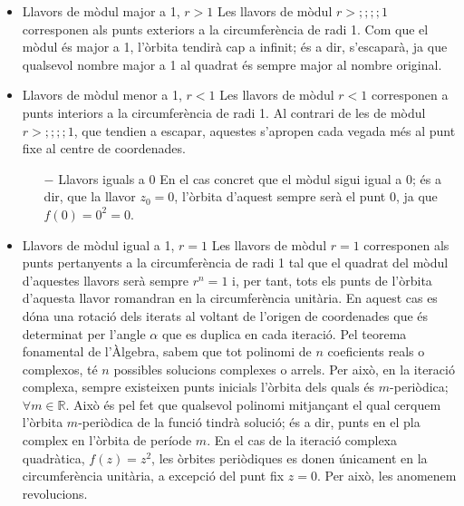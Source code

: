 \documentclass[12pt]{report}
\begin{document}
\begin{itemize}
    \item Llavors de mòdul major a 1, $r>1$
    \newline
   Les llavors de mòdul $r>;;;;1$ corresponen als punts exteriors a la circumferència de radi 1. Com que el mòdul és major a 1, l'òrbita tendirà cap a infinit; és a dir, s'escaparà, ja que qualsevol nombre major a 1 al quadrat és sempre major al nombre original.
\item Llavors de mòdul menor a 1, $r<1$
\newline
Les llavors de mòdul $r<1$ corresponen a punts interiors a la circumferència de radi 1. Al contrari de les de mòdul $r>;;;;1$, que tendien a escapar, aquestes s'apropen cada vegada més al punt fixe al centre de coordenades.
    \begin{itemize}
        \item [$-$] Llavors iguals a 0
        \newline
        En el cas concret que el mòdul sigui igual a 0; és a dir, que la llavor $z_0=0$, l'òrbita d'aquest sempre serà el punt 0, ja que $f(0)=0^2=0$.
    \end{itemize} 
    \item Llavors de mòdul igual a 1, $r=1$
    \newline
    Les llavors de mòdul $r=1$ corresponen als punts pertanyents a la circumferència de radi 1 tal que el quadrat del mòdul d'aquestes llavors serà sempre $r^n=1$ i, per tant, tots els punts de l'òrbita d'aquesta llavor romandran en la circumferència unitària.
\newline
En aquest cas es dóna una rotació dels iterats al voltant de l'origen de coordenades que és determinat per l'angle $\alpha$ que es duplica en cada iteració.
\newline
    \newline
   Pel teorema fonamental de l'Àlgebra, sabem que tot polinomi de $n$ coeficients reals o complexos, té $n$ possibles solucions complexes o arrels. Per això, en la iteració complexa, sempre existeixen punts inicials l'òrbita dels quals és $m$-periòdica; $\forall m \in \mathbb{R}$. Això és pel fet que qualsevol polinomi mitjançant el qual cerquem l'òrbita $m$-periòdica de la funció tindrà solució; és a dir, punts en el pla complex en l'òrbita de període $m$.
    \newline
    En el cas de la iteració complexa quadràtica, $f(z)=z^2$, les òrbites periòdiques es donen únicament en la circumferència unitària, a excepció del punt fix $z=0$. Per això, les anomenem revolucions.

\end{itemize}
\end{document}
